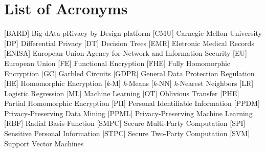 %

\chapter*{List of Acronyms}
%
\begin{acronym}


 [BARD] {Big dAta pRivacy by Design platform}
 [CMU] {Carnegie Mellon University}
 [DP] {Differential Privacy}
 [DT] {Decision Trees}
 [EMR] {Eletronic Medical Records}
 [ENISA] {European Union Agency for Network and Information Security}
 [EU] {European Union}
 [FE] {Functional Encryption}
 [FHE] {Fully Homomorphic Encryption}
 [GC] {Garbled Circuits}
 [GDPR] {General Data Protection Regulation}
 [HE] {Homomorphic Encryption}
 [\textit{k}-M] {\textit{k}-Means}
 [\textit{k}-NN] {\textit{k}-Nearest Neighbors}
 [LR] {Logistic Regression}
 [ML] {Machine Learning}
 [OT] {Oblivious Transfer}
 [PHE] {Partial Homomorphic Encryption}
 [PII] {Personal Identifiable Information}
 [PPDM] {Privacy-Preserving Data Mining}
 [PPML] {Privacy-Preserving Machine Learning}
 [RBF] {Radial Basis Function}
 [SMPC] {Secure Multi-Party Computation}
 [SPI] {Sensitive Personal Information}
 [STPC] {Secure Two-Party Computation}
 [SVM] {Support Vector Machines}

\end{acronym}

\cleardoublepage
